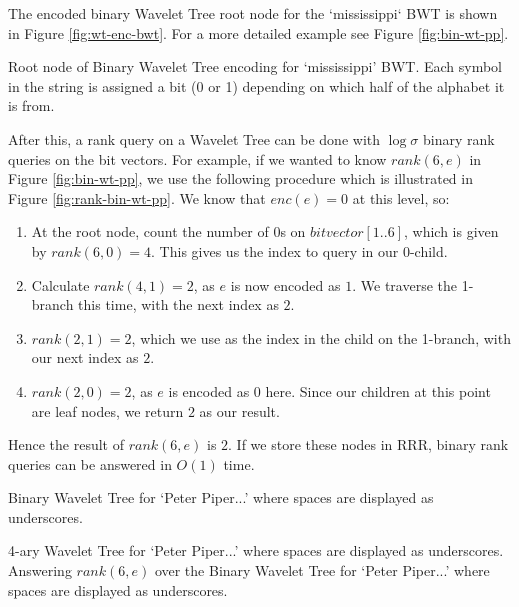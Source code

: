 The encoded binary Wavelet Tree root node for the `mississippi` BWT is shown in Figure \ref{fig:wt-enc-bwt}. For a more detailed example see Figure \ref{fig:bin-wt-pp}.


			{Root node of Binary Wavelet Tree encoding for `mississippi' BWT.
			Each symbol in the string is assigned a bit (0 or 1) depending
			on which half of the alphabet it is from.}

After this, a rank query on a Wavelet Tree can be done with $\log \sigma$ binary 
rank queries on the bit vectors. For example, if we wanted to know $rank(6, e)$ 
in Figure \ref{fig:bin-wt-pp}, we use the following procedure which is 
illustrated in Figure \ref{fig:rank-bin-wt-pp}. We know that $enc(e) = 0$ at 
this level, so:

\begin{enumerate}
    \item
		At the root node, count the number of $0$s on $bitvector[1..6]$,
		which is given by $rank(6, 0) = 4$. This gives us the index to query in 
		our 0-child.
    \item
		Calculate $rank(4, 1) = 2$, as $e$ is now encoded as $1$. We traverse
    	the 1-branch this time, with the next index as $2$.
    \item
		$rank(2, 1) = 2$, which we use as the index in the child on the
    	1-branch, with our next index as $2$.
    \item
		$rank(2, 0) = 2$, as $e$ is encoded as $0$ here. Since our children at 
		this point are leaf nodes, we return $2$ as our result.
\end{enumerate}

Hence the result of $rank(6, e)$ is $2$. If we store these nodes in RRR, 
binary rank queries can be answered in $O(1)$ time.

			{Binary Wavelet Tree for `Peter Piper...' where spaces are displayed
			as underscores.}
			
			{4-ary Wavelet Tree for `Peter Piper...' where spaces are 
			displayed as underscores.}
\clearpage
			{Answering $rank(6, e)$ over the Binary Wavelet Tree for `Peter
			Piper...' where spaces are displayed as underscores.}





